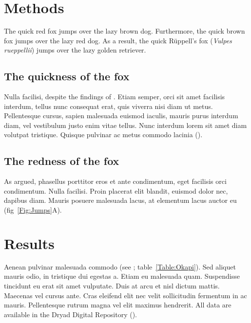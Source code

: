\documentclass[11pt]{article}
\begin{document}

\section*{Methods}

The quick red fox jumps over the lazy brown dog. Furthermore, the quick 
brown fox jumps over the lazy red dog. As a result, the quick 
R\"{u}ppell's fox (\textit{Vulpes rueppellii}) jumps over the lazy 
golden retriever.

\subsection*{The quickness of the fox}

Nulla facilisi, despite the findings of \citet{LemKapEx07}. Etiam 
semper, orci sit amet facilisis interdum, tellus nunc consequat erat, 
quis viverra nisi diam ut metus. Pellentesque cursus, sapien malesuada 
euismod iaculis, mauris purus interdum diam, vel vestibulum justo enim 
vitae tellus. Nunc interdum lorem sit amet diam volutpat tristique. 
Quisque pulvinar ac metus commodo lacinia (\citealt{Ing11,Xiao2015}).  

\subsection*{The redness of the fox}

As \citet{Xiao2015} argued, phasellus porttitor eros et ante 
condimentum, eget facilisis orci condimentum. Nulla facilisi. Proin 
placerat elit blandit, euismod dolor nec, dapibus diam. Mauris posuere 
malesuada lacus, at elementum lacus auctor eu (fig~\ref{Fig:Jumps}A). 

\section*{Results}

Aenean pulvinar malesuada commodo (see \citealt{DavisEtAl2011}; 
table~\ref{Table:Okapi}). Sed aliquet mauris odio, in tristique dui 
egestas a. Etiam eu malesuada quam. Suspendisse tincidunt eu erat sit 
amet vulputate. Duis at arcu et nisl dictum mattis. Maecenas vel cursus 
ante. Cras eleifend elit nec velit sollicitudin fermentum in ac mauris. 
Pellentesque rutrum magna vel elit maximus hendrerit. All data are 
available in the Dryad Digital Repository (\citealt{CookEtAl2015}).
\end{document}

